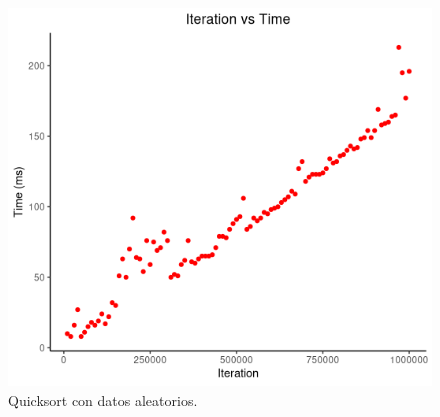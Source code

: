 \documentclass[paper=a4, fontsize=11pt]{scrartcl} %
\numberwithin{equation}{section} %
\numberwithin{figure}{section} %
\numberwithin{table}{section} %
\begin{document}
\begin{figure}
    \includegraphics[width=\linewidth]{quick_random.png}
    \caption{Quicksort con datos aleatorios.}
\end{figure}



\end{document}
